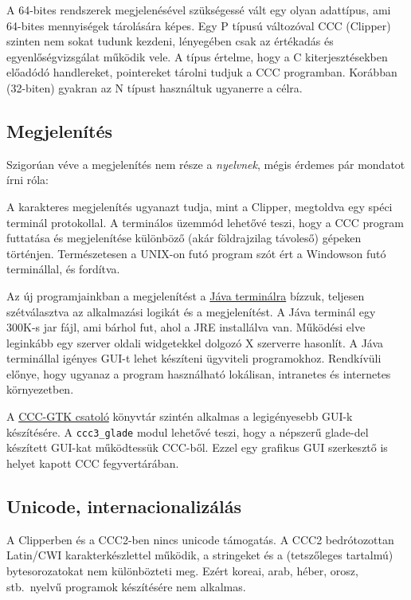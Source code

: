 A 64-bites rendszerek megjelenésével szükségessé vált
egy olyan adattípus, ami 64-bites mennyiségek tárolására képes.
Egy P típusú változóval CCC (Clipper) szinten nem sokat tudunk kezdeni,
lényegében csak az értékadás és egyenlőségvizsgálat működik vele.
A típus értelme, hogy a C kiterjesztésekben előadódó handlereket,
pointereket tárolni tudjuk a CCC programban. Korábban (32-biten)
gyakran az N típust használtuk ugyanerre a célra.


\subsection{Megjelenítés}

Szigorúan véve a megjelenítés nem része a 
{\em nyelvnek}, mégis érdemes pár mondatot írni róla:

A karakteres megjelenítés ugyanazt tudja, mint a Clipper, megtoldva 
egy spéci terminál protokollal. A terminálos üzemmód lehetővé teszi, 
hogy a CCC program futtatása és megjelenítése különböző (akár földrajzilag 
távoleső) gépeken történjen. Természetesen a UNIX-on futó program szót 
ért a Windowson futó terminállal, és fordítva.

Az új programjainkban a megjelenítést a 
\href{jterminal.html}{Jáva terminálra}
bízzuk, teljesen szétválasztva az alkalmazási logikát  és a megjelenítést.  
A Jáva terminál egy 300K-s jar fájl, ami bárhol fut, ahol a JRE installálva 
van. Működési elve leginkább egy szerver oldali widgetekkel dolgozó 
X szerverre hasonlít. A Jáva terminállal igényes GUI-t lehet készíteni 
ügyviteli programokhoz. Rendkívüli előnye, hogy ugyanaz a program 
használható lokálisan, intranetes és internetes környezetben.

A \href{cccgtk.html}{CCC-GTK csatoló} könyvtár szintén alkalmas 
a legigényesebb GUI-k készítésére. A \verb!ccc3_glade! modul lehetővé teszi, 
hogy a népszerű glade-del készített GUI-kat működtessük CCC-ből.
Ezzel egy grafikus GUI szerkesztő is helyet kapott CCC fegyvertárában.


\subsection{Unicode, internacionalizálás}

A Clipperben és a CCC2-ben nincs unicode támogatás.
A CCC2 bedrótozottan Latin/CWI karakterkészlettel működik, 
a stringeket és a (tetszőleges tartalmú) bytesorozatokat nem 
különbözteti meg. Ezért koreai, arab, héber, orosz, stb.\ nyelvű 
programok készítésére nem alkalmas. 

